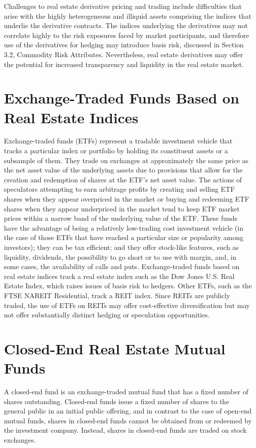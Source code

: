 \documentclass[11pt]{article}
\begin{document}
Challenges to real estate derivative pricing and trading include difficulties that arise with the highly heterogeneous and illiquid assets comprising the indices that underlie the derivative contracts. The indices underlying the derivatives may not correlate highly to the risk exposures faced by market participants, and therefore use of the derivatives for hedging may introduce basis risk, discussed in Section 3.2, Commodity Risk Attributes. Nevertheless, real estate derivatives may offer the potential for increased transparency and liquidity in the real estate market.

\section*{Exchange-Traded Funds Based on Real Estate Indices}
Exchange-traded funds (ETFs) represent a tradable investment vehicle that tracks a particular index or portfolio by holding its constituent assets or a subsample of them. They trade on exchanges at approximately the same price as the net asset value of the underlying assets due to provisions that allow for the creation and redemption of shares at the ETF's net asset value. The actions of speculators attempting to earn arbitrage profits by creating and selling ETF shares when they appear overpriced in the market or buying and redeeming ETF shares when they appear underpriced in the market tend to keep ETF market prices within a narrow band of the underlying value of the ETF. These funds have the advantage of being a relatively low-trading cost investment vehicle (in the case of those ETFs that have reached a particular size or popularity among investors); they can be tax efficient; and they offer stock-like features, such as liquidity, dividends, the possibility to go short or to use with margin, and, in some cases, the availability of calls and puts. Exchange-traded funds based on real estate indices track a real estate index such as the Dow Jones U.S. Real Estate Index, which raises issues of basis risk to hedgers. Other ETFs, such as the FTSE NAREIT Residential, track a REIT index. Since REITs are publicly traded, the use of ETFs on REITs may offer cost-effective diversification but may not offer substantially distinct hedging or speculation opportunities.

\section*{Closed-End Real Estate Mutual Funds}
A closed-end fund is an exchange-traded mutual fund that has a fixed number of shares outstanding. Closed-end funds issue a fixed number of shares to the general public in an initial public offering, and in contrast to the case of open-end mutual funds, shares in closed-end funds cannot be obtained from or redeemed by the investment company. Instead, shares in closed-end funds are traded on stock exchanges.
\end{document}
